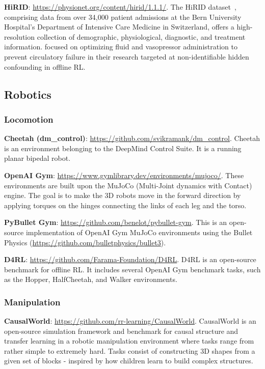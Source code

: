 \documentclass[10pt]{article} %
\theoremstyle{definition}
\begin{document}
\textbf{HiRID}: \url{https://physionet.org/content/hirid/1.1.1/}. The HiRID dataset~\citep{hylandEarlyPredictionCirculatory2020,faltys2021hirid}, comprising data from over 34,000 patient admissions at the Bern University Hospital's Department of Intensive Care Medicine in Switzerland, offers a high-resolution collection of demographic, physiological, diagnostic, and treatment information. \citet{paceDelphicOfflineReinforcement2023} focused on optimizing fluid and vasopressor administration to prevent circulatory failure in their research targeted at non-identifiable hidden confounding in offline RL.

\subsection{Robotics}
\subsubsection{Locomotion}
\textbf{Cheetah (dm\_control)}: \url{https://github.com/svikramank/dm\_control}. Cheetah is an environment belonging to the DeepMind Control Suite. It is a running planar bipedal robot.

\textbf{OpenAI Gym}: \url{https://www.gymlibrary.dev/environments/mujoco/}. These environments are built upon the MuJoCo (Multi-Joint dynamics with Contact) engine. The goal is to make the 3D robots move in the forward direction by applying torques on the hinges connecting the links of each leg and the torso.

\textbf{PyBullet Gym}: \url{https://github.com/benelot/pybullet-gym}. This is an open-source implementation of OpenAI Gym MuJoCo environments using the Bullet Physics (\url{https://github.com/bulletphysics/bullet3}).

\textbf{D4RL}: \url{https://github.com/Farama-Foundation/D4RL}. D4RL is an open-source benchmark for offline RL. It includes several OpenAI Gym benchmark tasks, such as the Hopper, HalfCheetah, and Walker environments.

\subsubsection{Manipulation}
\textbf{CausalWorld}: \url{https://github.com/rr-learning/CausalWorld}. CausalWorld is an open-source simulation framework and benchmark for causal structure and transfer learning in a robotic manipulation environment where tasks range from rather simple to extremely hard. Tasks consist of constructing 3D shapes from a given set of blocks - inspired by how children learn to build complex structures.
\end{document}
